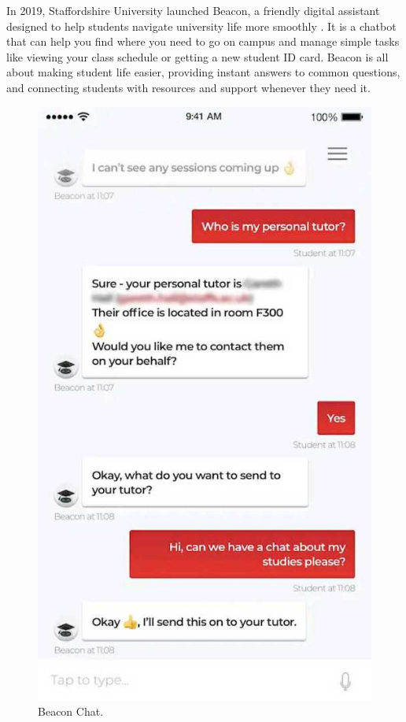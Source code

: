 \documentclass{l4proj}
\begin{document}
In 2019, Staffordshire University launched Beacon, a friendly digital assistant designed to help students navigate university life more smoothly \citep{staffsBeaconYour}. It is a chatbot that can help you find where you need to go on campus and manage simple tasks like viewing your class schedule or getting a new student ID card. Beacon is all about making student life easier, providing instant answers to common questions, and connecting students with resources and support whenever they need it. 

\begin{figure}[h!]
  \centering
  \begin{adjustbox}{center,max height=0.34\textheight, max width=\linewidth}
    \includegraphics{images/beacon.jpg}
  \end{adjustbox}
  \caption{Beacon Chat.}
\end{figure}
\end{document}
